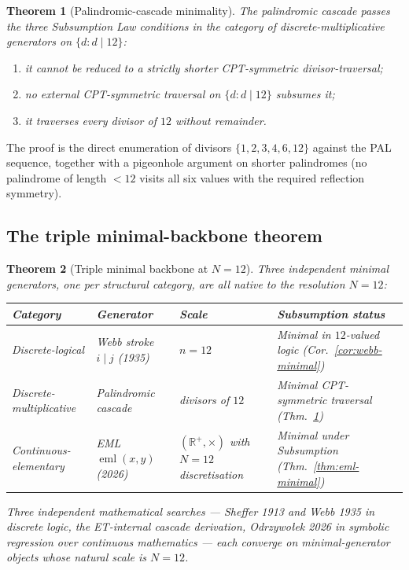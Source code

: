 \documentclass[11pt,a4paper]{article}
\newtheorem{theorem}{Theorem}[section]
\theoremstyle{definition}
\theoremstyle{remark}
\newcommand{\R}{\mathbb{R}}
\begin{document}
\begin{theorem}[Palindromic-cascade minimality]\label{thm:palindromic-minimal}
The palindromic cascade passes the three Subsumption Law conditions in the category of discrete-multiplicative generators on $\{d : d \mid 12\}$:
\begin{enumerate}[label=(\roman*),leftmargin=*]
\item it cannot be reduced to a strictly shorter CPT-symmetric divisor-traversal;
\item no external CPT-symmetric traversal on $\{d:d\mid 12\}$ subsumes it;
\item it traverses every divisor of $12$ without remainder.
\end{enumerate}
\end{theorem}

The proof is the direct enumeration of divisors $\{1,2,3,4,6,12\}$ against the PAL sequence, together with a pigeonhole argument on shorter palindromes (no palindrome of length $<12$ visits all six values with the required reflection symmetry).

\subsection{The triple minimal-backbone theorem}\label{subsec:triple-backbone}

\begin{theorem}[Triple minimal backbone at $N=12$]\label{thm:triple-backbone}
Three independent minimal generators, one per structural category, are all native to the resolution $N=12$:
\begin{center}
\begin{tabular}{@{}l l l l@{}}
\toprule
Category & Generator & Scale & Subsumption status\\
\midrule
Discrete-logical & Webb stroke $i\mathbin{|}j$ (1935) & $n=12$ & Minimal in $12$-valued logic (Cor.~\ref{cor:webb-minimal})\\
Discrete-multiplicative & Palindromic cascade & divisors of $12$ & Minimal CPT-symmetric traversal (Thm.~\ref{thm:palindromic-minimal})\\
Continuous-elementary & EML $\operatorname{eml}(x,y)$ (2026) & $(\R^{+},\times)$ with $N=12$ discretisation & Minimal under Subsumption (Thm.~\ref{thm:eml-minimal})\\
\bottomrule
\end{tabular}
\end{center}
Three independent mathematical searches --- Sheffer 1913 and Webb 1935 in discrete logic, the ET-internal cascade derivation, Odrzywołek 2026 in symbolic regression over continuous mathematics --- each converge on minimal-generator objects whose natural scale is $N=12$.
\end{theorem}
\end{document}

